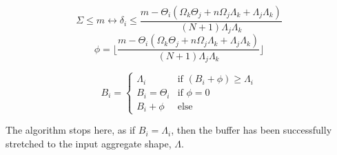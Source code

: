 \documentclass[conference]{IEEEtran}
\begin{document}
$$\Sigma \leq m \leftrightarrow \delta_i \leq \frac{m-\Theta_i(\Omega_k\Theta_j + n\Omega_j\Lambda_k + \Lambda_j\Lambda_k)}{(N+1)\Lambda_j\Lambda_k}$$
$$\phi = \lfloor \frac{m-\Theta_i(\Omega_k\Theta_j + n\Omega_j\Lambda_k + \Lambda_j\Lambda_k)}{(N+1)\Lambda_j\Lambda_k} \rfloor$$

$$B_i = \begin{cases}
  \Lambda_i & \textrm{if }(B_i+\phi) \geq \Lambda_i \\
  B_i = \Theta_i & \textrm{if }\phi = 0 \\
  B_i+\phi & \textrm{else}
\end{cases}$$

The algorithm stops here, as if $B_i=\Lambda_i$, then the buffer has been
successfully stretched to the input aggregate shape, $\Lambda$.
\end{document}

